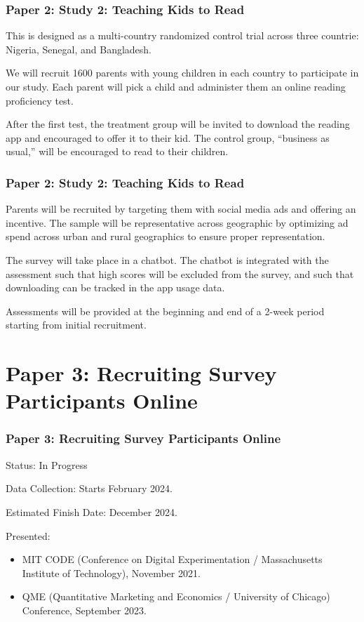 \documentclass[aspectratio=169]{beamer}
\begin{document}
\begin{frame}
\frametitle{Paper 2: Study 2: Teaching Kids to Read}

This is designed as a multi-country randomized control trial across three countrie: Nigeria, Senegal, and Bangladesh. 

We will recruit 1600 parents with young children in each country to participate in our study. Each parent will pick a child and administer them an online reading proficiency test. 

After the first test, the treatment group will be invited to download the reading app and encouraged to offer it to their kid. The control group, ``business as usual,'' will be encouraged to read to their children. 

\end{frame}


\begin{frame}
\frametitle{Paper 2: Study 2: Teaching Kids to Read}

Parents will be recruited by targeting them with social media ads and offering an incentive. The sample will be representative across geographic by optimizing ad spend across urban and rural geographics to ensure proper representation. 

The survey will take place in a chatbot. The chatbot is integrated with the assessment such that high scores will be excluded from the survey, and such that downloading can be tracked in the app usage data. 

Assessments will be provided at the beginning and end of a 2-week period starting from initial recruitment. 

\end{frame}

\section{Paper 3: Recruiting Survey Participants Online}
\begin{frame}

\frametitle{Paper 3: Recruiting Survey Participants Online }  

Status: In Progress

Data Collection: Starts February 2024.

Estimated Finish Date: December 2024.

Presented: 

\begin{itemize}
\item MIT CODE (Conference on Digital Experimentation / Massachusetts Institute of Technology), November 2021.
\item QME (Quantitative Marketing and Economics / University of Chicago) Conference, September 2023. 
\end{itemize}


\end{frame}
\end{document}
